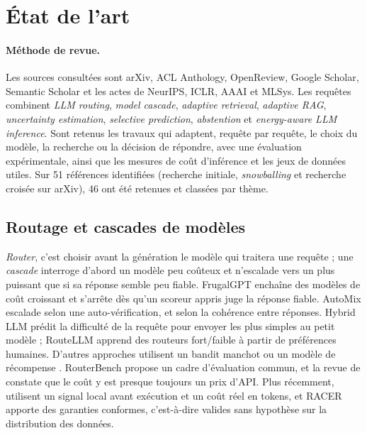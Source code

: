 \documentclass[11pt,a4paper]{article}
\begin{document}
\section{État de l'art}\label{sec:etat}

\paragraph{Méthode de revue.} Les sources consultées sont arXiv, ACL Anthology, OpenReview, Google
Scholar, Semantic Scholar et les actes de NeurIPS, ICLR, AAAI et MLSys. Les requêtes combinent
\textit{LLM routing}, \textit{model cascade}, \textit{adaptive retrieval}, \textit{adaptive RAG},
\textit{uncertainty estimation}, \textit{selective prediction}, \textit{abstention} et
\textit{energy-aware LLM inference}. Sont retenus les travaux qui adaptent, requête par requête, le
choix du modèle, la recherche ou la décision de répondre, avec une évaluation expérimentale, ainsi que
les mesures de coût d'inférence et les jeux de données utiles. Sur 51 références identifiées (recherche
initiale, \emph{snowballing} et recherche croisée sur arXiv), 46 ont été retenues et classées par thème.

\subsection{Routage et cascades de modèles}

\emph{Router}, c'est choisir avant la génération le modèle qui traitera une requête ; une
\emph{cascade} interroge d'abord un modèle peu coûteux et n'escalade vers un plus puissant que si sa
réponse semble peu fiable. FrugalGPT \citep{chen2023frugalgpt} enchaîne des modèles de coût croissant et
s'arrête dès qu'un scoreur appris juge la réponse fiable. AutoMix \citep{aggarwal2023automix} escalade
selon une auto-vérification, et \citet{yue2023cascades} selon la cohérence entre réponses. Hybrid LLM
\citep{ding2024hybrid} prédit la difficulté de la requête pour envoyer les plus simples au petit modèle ;
RouteLLM \citep{ong2024routellm} apprend des routeurs fort/faible à partir de préférences humaines.
D'autres approches utilisent un bandit manchot \citep{nguyen2024metallm} ou un modèle de récompense
\citep{lu2023zooter}. RouterBench \citep{hu2024routerbench} propose un cadre d'évaluation commun, et la
revue de \citet{varangot2025survey} constate que le coût y est presque toujours un prix d'API. Plus
récemment, \citet{fu2026inflation} utilisent un signal local avant exécution et un coût réel en tokens,
et RACER \citep{hao2026racer} apporte des garanties conformes, c'est-à-dire valides sans hypothèse sur la
distribution des données.
\end{document}

